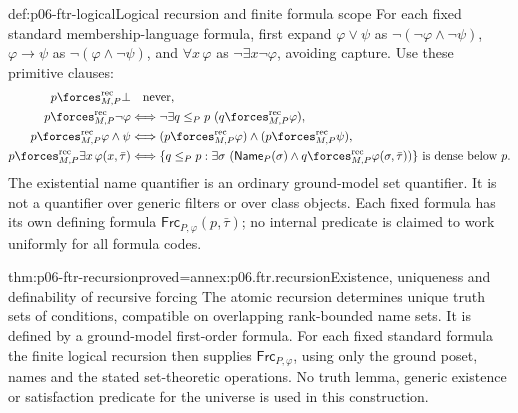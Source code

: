 \begin{hbdefinition}{def:p06-ftr-logical}{Logical recursion and finite formula scope}
For each fixed standard membership-language formula, first expand
\(\varphi\lor\psi\) as \(\neg(\neg\varphi\land\neg\psi)\),
\(\varphi\to\psi\) as \(\neg(\varphi\land\neg\psi)\), and
\(\forall x\,\varphi\) as \(\neg\exists x\neg\varphi\), avoiding capture.
Use these primitive clauses:
\[
\begin{aligned}
 p\forces^{\mathrm{rec}}_{M,P}\bot&\quad\text{never},\\
 p\forces^{\mathrm{rec}}_{M,P}\neg\varphi
 &\Longleftrightarrow\neg\exists q\leq_P p\
                      (q\forces^{\mathrm{rec}}_{M,P}\varphi),\\
 p\forces^{\mathrm{rec}}_{M,P}\varphi\land\psi
 &\Longleftrightarrow(p\forces^{\mathrm{rec}}_{M,P}\varphi)
                     \land(p\forces^{\mathrm{rec}}_{M,P}\psi),\\
 p\forces^{\mathrm{rec}}_{M,P}\exists x\,\varphi(x,\bar\tau)
 &\Longleftrightarrow
 \{q\leq_P p:\exists\sigma\
   (\mathsf{Name}_P(\sigma)\land
      q\forces^{\mathrm{rec}}_{M,P}\varphi(\sigma,\bar\tau))\}
      \text{ is dense below }p.
\end{aligned}
\]
The existential name quantifier is an ordinary ground-model set quantifier.
It is not a quantifier over generic filters or over class objects.
Each fixed formula has its own defining formula
\(\mathsf{Frc}_{P,\varphi}(p,\bar\tau)\); no internal predicate is claimed
to work uniformly for all formula codes.
\end{hbdefinition}

\begin{hbtheorem}{thm:p06-ftr-recursion}{proved=annex:p06.ftr.recursion}{Existence, uniqueness and definability of recursive forcing}
The atomic recursion determines unique truth sets of conditions, compatible
on overlapping rank-bounded name sets. It is defined by a ground-model
first-order formula. For each fixed standard formula the finite logical
recursion then supplies \(\mathsf{Frc}_{P,\varphi}\), using only the ground
poset, names and the stated set-theoretic operations. No truth lemma, generic
existence or satisfaction predicate for the universe is used in this
construction.
\end{hbtheorem}

